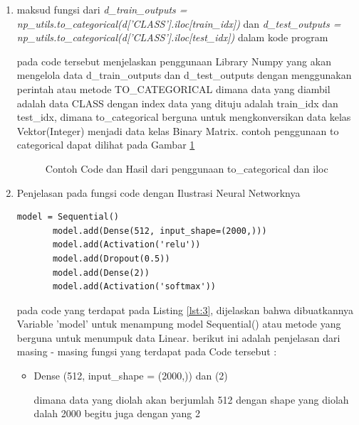 \begin{enumerate}
\item maksud fungsi dari \emph{d\_train\_outputs = np\_utils.to\_categorical(d['CLASS'].iloc[train\_idx])} dan \emph{d\_test\_outputs = np\_utils.to\_categorical(d['CLASS'].iloc[test\_idx])} dalam kode program

\par pada code tersebut menjelaskan penggunaan Library Numpy yang akan mengelola data d\_train\_outputs dan d\_test\_outputs dengan menggunakan perintah atau metode TO\_CATEGORICAL dimana data yang diambil adalah data CLASS dengan index data yang dituju adalah train\_idx dan test\_idx, dimana to\_categorical berguna untuk mengkonversikan data kelas Vektor(Integer) menjadi data kelas Binary Matrix. contoh penggunaan to categorical dapat dilihat pada Gambar \ref{data9}

\begin{figure}[!htbp]
      \caption{Contoh Code dan Hasil dari penggunaan to\_categorical dan iloc}
      \label{data9}
\end{figure}

\item Penjelasan pada fungsi code dengan Ilustrasi Neural Networknya
\begin{lstlisting}[caption=Membuat model Neural Network,label={lst:2}]
       model = Sequential()
       model.add(Dense(512, input_shape=(2000,)))
       model.add(Activation('relu'))
       model.add(Dropout(0.5))
       model.add(Dense(2))
       model.add(Activation('softmax'))
\end{lstlisting}
\par pada code yang terdapat pada  Listing \ref{lst:3}, dijelaskan bahwa dibuatkannya Variable 'model' untuk menampung model Sequential() atau metode yang berguna untuk menumpuk data Linear. berikut ini adalah  penjelasan dari masing - masing fungsi yang terdapat pada Code tersebut :
\begin{itemize}
\item Dense (512, input\_shape = (2000,)) dan (2)
\par dimana data yang diolah akan berjumlah 512 dengan shape yang diolah dalah 2000 begitu juga dengan yang 2


\end{itemize}
\end{enumerate}
